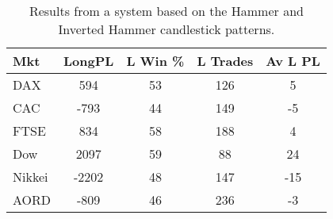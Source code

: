 \begin{table}[ht]
\centering
\caption[Results from a system based on the Hammer and Inverted Hammer candlestick patterns]{Results from a system based on the Hammer and Inverted Hammer candlestick patterns.} 
\label{tab:hammer_results}
\begin{tabular}{lcccc}
  \toprule Mkt & LongPL & L Win \% & L Trades & Av L PL \\ 
  \midrule DAX & 594 & 53 & 126 & 5 \\ 
  CAC & -793 & 44 & 149 & -5 \\ 
  FTSE & 834 & 58 & 188 & 4 \\ 
  Dow & 2097 & 59 & 88 & 24 \\ 
  Nikkei & -2202 & 48 & 147 & -15 \\ 
  AORD & -809 & 46 & 236 & -3 \\ 
   \bottomrule \end{tabular}
\end{table}
